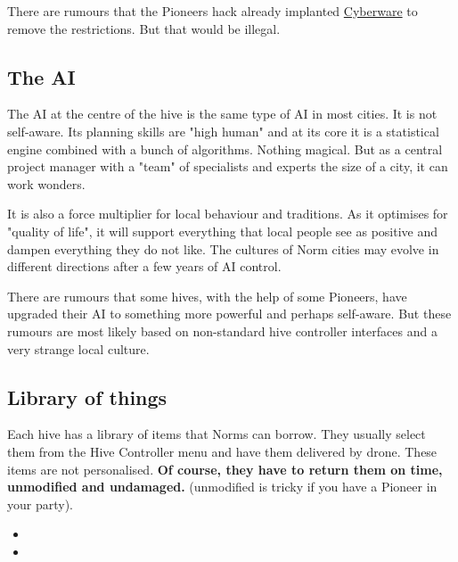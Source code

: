 There are rumours that the Pioneers hack already implanted \hyperref[sec:Cyberware Pioneers]{Cyberware} to remove the restrictions. But that would be illegal.


\subsection{The AI}

The AI at the centre of the hive is the same type of AI in most cities. It is not self-aware. Its planning skills are "high human" and at its core it is a statistical engine combined with a bunch of algorithms. Nothing magical. But as a central project manager with a "team" of specialists and experts the size of a city, it can work wonders.

It is also a force multiplier for local behaviour and traditions. As it optimises for "quality of life", it will support everything that local people see as positive and dampen everything they do not like. The cultures of Norm cities may evolve in different directions after a few years of AI control.

There are rumours that some hives, with the help of some Pioneers, have upgraded their AI to something more powerful and perhaps self-aware. But these rumours are most likely based on non-standard hive controller interfaces and a very strange local culture.

\subsection{Library of things}

Each hive has a library of items that Norms can borrow. They usually select them from the Hive Controller menu and have them delivered by drone. These items are not personalised. \textbf{Of course, they have to return them on time, unmodified and undamaged.} (unmodified is tricky if you have a Pioneer in your party).

\begin{normtalk}[title=Problem solved]
    \begin{itemize}
        \item {}
        \item {}
    \end{itemize}
\end{normtalk}

